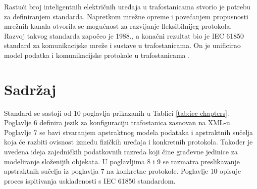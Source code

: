\documentclass[times, utf8, zavrsni]{fer}
\begin{document}
Rastući broj inteligentnih električnih uređaja  u trafostanicama stvorio je potrebu za definiranjem standarda. Napretkom mrežne opreme i povećanjem propusnosti mrežnih kanala otvorila se mogućnost za razvijanje fleksibilnijeg protokola. Razvoj takvog standarda započeo je 1988., a konačni rezultat bio je IEC 61850 standard za komunikacijske mreže i sustave u trafostanicama. On je unificirao model podatka i komunikacijske protokole u trafostanicama \citep{baigent2004iec}.

\section{Sadržaj}
Standard se sastoji od 10 poglavlja prikazanih u Tablici \ref{tab:iec-chapters}. Poglavlje 6 definira jezik za konfiguraciju trafostanica  zasnovan na XML-u.  Poglavlje 7 se bavi stvaranjem apstraktnog modela podataka i apstraktnih sučelja koja će razbiti ovisnost između fizičkih uređaja i konkretnih protokola. Također je uvedena ideja zajedničkih podatkovnih razreda  koji čine građevne jedinice za modeliranje složenijih objekata. U poglavljima 8 i 9 se razmatra preslikavanje apstraktnih sučelja iz poglavlja 7 na konkretne protokole. Poglavlje 10 opisuje proces ispitivanja usklađenosti s IEC 61850 standardom.
\end{document}
